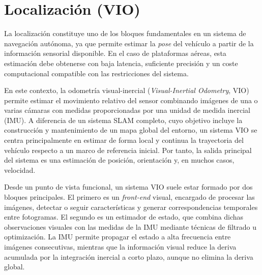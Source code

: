 
    \section{Localización (VIO)}
    La localización constituye uno de los bloques fundamentales en un sistema de navegación autónoma, ya que permite estimar la \textit{pose}
    del vehículo a partir de la información sensorial disponible. En el caso de plataformas aéreas, esta estimación debe
    obtenerse con baja latencia, suficiente precisión y un coste computacional compatible con las restricciones del sistema.

    En este contexto, la odometría visual-inercial (\textit{Visual-Inertial Odometry}, VIO) permite estimar el movimiento relativo del sensor
    combinando imágenes de una o varias cámaras con medidas proporcionadas por una unidad de medida inercial (IMU). A diferencia de un sistema
    SLAM completo, cuyo objetivo incluye la construcción y mantenimiento de un mapa global del entorno, un sistema VIO se centra principalmente
    en estimar de forma local y continua la trayectoria del vehículo respecto a un marco de referencia inicial. Por tanto, la salida principal
    del sistema es una estimación de posición, orientación y, en muchos casos, velocidad.

    Desde un punto de vista funcional, un sistema VIO suele estar formado por dos bloques principales. El primero es un \textit{front-end}
    visual, encargado de procesar las imágenes, detectar o seguir características y generar correspondencias temporales entre fotogramas. El
    segundo es un estimador de estado, que combina dichas observaciones visuales con las medidas de la IMU mediante técnicas de filtrado u
    optimización. La IMU permite propagar el estado a alta frecuencia entre imágenes consecutivas, mientras que la información visual reduce la
    deriva acumulada por la integración inercial a corto plazo, aunque no elimina la deriva global.

